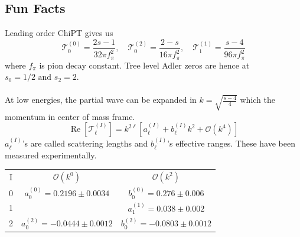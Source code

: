 ﻿\documentclass[12pt,a4paper]{article}
\begin{document}
\subsection{Fun Facts}
Leading order ChiPT gives us \cite{2} 
$$
\mathcal{T}_{0}^{(0)}=\frac{2 s-1}{32 \pi f_{\pi}^{2}}, \quad \mathcal{T}_{0}^{(2)}=\frac{2-s}{16 \pi f_{\pi}^{2}}, \quad \mathcal{T}_{1}^{(1)}=\frac{s-4}{96 \pi f_{\pi}^{2}}
$$
where $ f_{\pi}$ is pion decay constant. Tree level Adler zeros are hence at $s_{0}=1 / 2 \text { and } s_{2}=2$.\\\\
At low energies, the partial wave can be expanded in $k=\sqrt{\frac{s-4}{4}}$ which the momentum in center of mass frame.
$$
\operatorname{Re}\left[\mathcal{T}_{\ell}^{(I)}\right]=k^{2 \ell}\left[a_{\ell}^{(I)}+b_{\ell}^{(I)} k^{2}+\mathcal{O}\left(k^{4}\right)\right]
$$
$a_{\ell}^{(I)}$'s are called scattering lengths and $b_{\ell}^{(I)}$'s effective ranges. These have been measured experimentally.
\begin{center}
\begin{tabular}{ |c|c|c| } 
 \hline
 I&$\mathcal{O}(k^{0})$&$\mathcal{O}(k^{2})$\\
 0 & $a_{0}^{(0)}=0.2196\pm 0.0034$ & $b_{0}^{(0)}=0.276\pm 0.006$ \\ 
 1 &  & $a_{1}^{(1)}=0.038\pm 0.002$ \\ 
 2 & $a_{0}^{(2)}=-0.0444\pm 0.0012$ & $b_{0}^{(2)}=-0.0803\pm 0.0012$ \\ 
 \hline
\end{tabular}
\end{center}
\end{document}
